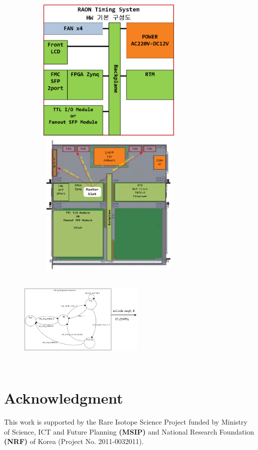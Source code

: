 \documentclass[journal,reqno]{IEEEtran}
\begin{document}
\begin{figure}[!htb]
	\centering
	\includegraphics*[width=90mm, height=70mm]{img03.png}
	\includegraphics*[width=90mm, height=70mm]{img04.png}
	\includegraphics*[width=60mm, height=50mm]{img17.png}
\end{figure}

\section*{Acknowledgment}
This work is supported by the Rare Isotope Science Project funded by Ministry of Science, ICT and Future Planning \textbf{(MSIP)} and National Research Foundation \textbf{(NRF)} of Korea (Project No. 2011-0032011).
\end{document}
